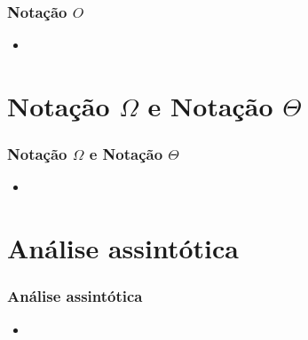 \documentclass[aspectratio=169]{beamer}
\begin{document}
\begin{frame}\frametitle{Notação $O$}
\begin{itemize}
	\item 
\end{itemize}
\end{frame}

\section{Notação $\Omega$ e Notação $\Theta$}

\begin{frame}\frametitle{Notação $\Omega$ e Notação $\Theta$}
\begin{itemize}
	\item 
\end{itemize}
\end{frame}

\section{Análise assintótica}

\begin{frame}\frametitle{Análise assintótica}
\begin{itemize}
	\item 
\end{itemize}
\end{frame}
\end{document}
